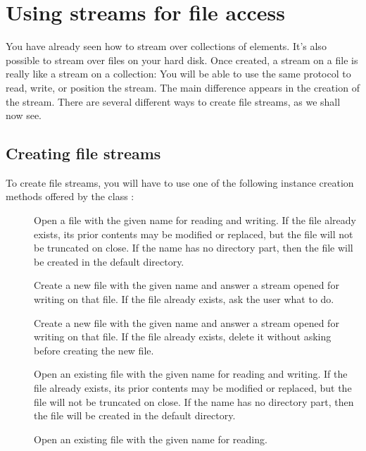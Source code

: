 \documentclass[a4paper,10pt,twoside]{book}
\begin{document}
\section{Using streams for file access}

You have already seen how to stream over collections of elements.
It's also possible to stream over files on your hard disk.
Once created, a stream on a file is really like a stream on a collection:
You will be able to use the same protocol to read, write, or position the stream.
The main difference appears in the creation of the stream.
There are several different ways to create file streams, as we shall now see.

\subsection{Creating file streams}
\label{sec:creat-file-stre}

To create file streams, you will have to use one of the following instance creation methods offered by the class :

\begin{description}

\item[]
  Open a file with the given name for reading and writing.
  If the file already exists, its prior contents may be modified or replaced, but the file will not be truncated on close.
  If the name has no directory part, then the file will be created in the default directory.

\item[]
  Create a new file with the given name and answer a stream opened for writing on that file.
  If the file already exists, ask the user what to do.

\item[]
  Create a new file with the given name and answer a stream opened for writing on that file.
  If the file already exists, delete it without asking before creating the new file.

\item[]
  Open an existing file with the given name for reading and writing.
  If the file already exists, its prior contents may be modified or replaced, but the file will not be truncated on close.
  If the name has no directory part, then the file will be created in the default directory.

\item[] Open an existing file with the
	given name for reading.

\end{description}
\end{document}
